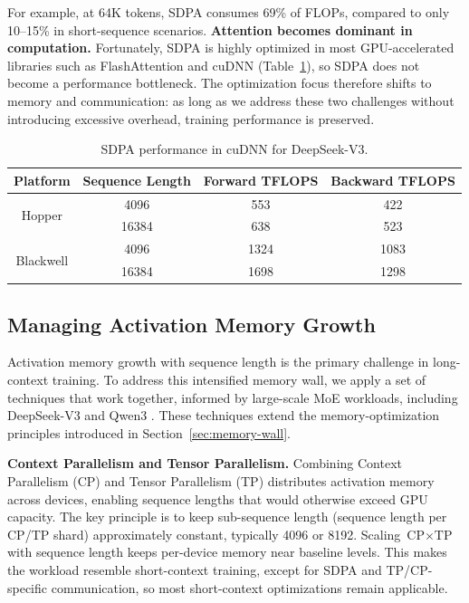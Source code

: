 For example, at 64K tokens, SDPA consumes 69\% of FLOPs, compared to only 10--15\% in short-sequence scenarios. \textbf{Attention becomes dominant in computation.} Fortunately, SDPA is highly optimized in most GPU-accelerated libraries such as FlashAttention \cite{dao2022flashattention,dao2023flashattention2,shah2024flashattention3} and cuDNN (Table~\ref{tab:sdpa-cudnn-perf}), so SDPA does not become a performance bottleneck. The optimization focus therefore shifts to memory and communication: as long as we address these two challenges without introducing excessive overhead, training performance is preserved.

\begin{table}[ht]
\centering
\caption{SDPA performance in cuDNN for DeepSeek-V3.}
\label{tab:sdpa-cudnn-perf}
\begin{tabular}{cccc}
\toprule
\textbf{Platform} & \textbf{Sequence Length} & \textbf{Forward TFLOPS} & \textbf{Backward TFLOPS} \\
\midrule
\multirow{2}{*}{Hopper}
 & 4096  & 553  & 422 \\
 & 16384 & 638  & 523 \\
\midrule
\multirow{2}{*}{Blackwell}
 & 4096  & 1324 & 1083 \\
 & 16384 & 1698 & 1298 \\
\bottomrule
\end{tabular}
\end{table}

\subsection{Managing Activation Memory Growth}

Activation memory growth with sequence length is the primary challenge in long-context training. To address this intensified memory wall, we apply a set of techniques that work together, informed by large-scale MoE workloads, including DeepSeek-V3 \cite{deepseekai2025deepseekv3technicalreport} and Qwen3 \cite{yang2025qwen3technicalreport}. These techniques extend the memory-optimization principles introduced in Section~\ref{sec:memory-wall}.

\textbf{Context Parallelism and Tensor Parallelism.}
Combining Context Parallelism (CP) and Tensor Parallelism (TP) distributes activation memory across devices, enabling sequence lengths that would otherwise exceed GPU capacity. The key principle is to keep sub-sequence length (sequence length per CP/TP shard) approximately constant, typically 4096 or 8192. Scaling $\text{CP} \times \text{TP}$ with sequence length keeps per-device memory near baseline levels. This makes the workload resemble short-context training, except for SDPA and TP/CP-specific communication, so most short-context optimizations remain applicable.

